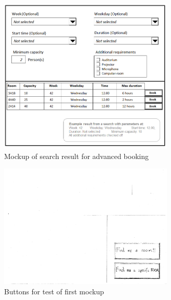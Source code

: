 \begin{figure}[htb]
\begin{center}
\leavevmode
\includegraphics[width=0.75\textwidth]{images/advanced_mockup}
\end{center}
\caption{Mockup of search result for advanced booking}
\label{fig:app1_mock1_5}
\end{figure}

\begin{figure}[htb]
\begin{center}
\leavevmode
\includegraphics[width=0.75\textwidth]{images/buttons1}
\end{center}
\caption{Buttons for test of first mockup}
\label{fig:app1_mock1_6}
\end{figure}

